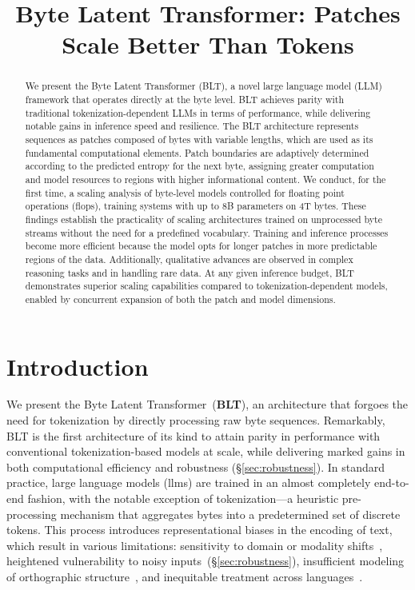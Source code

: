 \title{Byte Latent Transformer: Patches Scale Better Than Tokens}

\begin{abstract}
We present the Byte Latent Transformer ({\textsc BLT}), a novel large language model (LLM) framework that operates directly at the byte level. {\textsc BLT} achieves parity with traditional tokenization-dependent LLMs in terms of performance, while delivering notable gains in inference speed and resilience. The {\textsc BLT} architecture represents sequences as patches composed of bytes with variable lengths, which are used as its fundamental computational elements. Patch boundaries are adaptively determined according to the predicted entropy for the next byte, assigning greater computation and model resources to regions with higher informational content. We conduct, for the first time, a scaling analysis of byte-level models controlled for floating point operations (flops), training systems with up to 8B parameters on 4T bytes. These findings establish the practicality of scaling architectures trained on unprocessed byte streams without the need for a predefined vocabulary. Training and inference processes become more efficient because the model opts for longer patches in more predictable regions of the data. Additionally, qualitative advances are observed in complex reasoning tasks and in handling rare data. At any given inference budget, {\textsc BLT} demonstrates superior scaling capabilities compared to tokenization-dependent models, enabled by concurrent expansion of both the patch and model dimensions.
\end{abstract}

\section{Introduction}
\label{section:intro}

We present the Byte Latent Transformer~(\textbf{BLT}), an architecture that forgoes the need for tokenization by directly processing raw byte sequences. Remarkably, BLT is the first architecture of its kind to attain parity in performance with conventional tokenization-based models at scale, while delivering marked gains in both computational efficiency and robustness (\S\ref{sec:robustness}). In standard practice, large language models (llms) are trained in an almost completely end-to-end fashion, with the notable exception of tokenization---a heuristic pre-processing mechanism that aggregates bytes into a predetermined set of discrete tokens. This process introduces representational biases in the encoding of text, which result in various limitations: sensitivity to domain or modality shifts~\citep{dagangetting}, heightened vulnerability to noisy inputs~(\S\ref{sec:robustness}), insufficient modeling of orthographic structure~\citep{edman2024cute}, and inequitable treatment across languages~\citep{liang2023xlm,petrov2024language,limisiewicz2024myte}.

